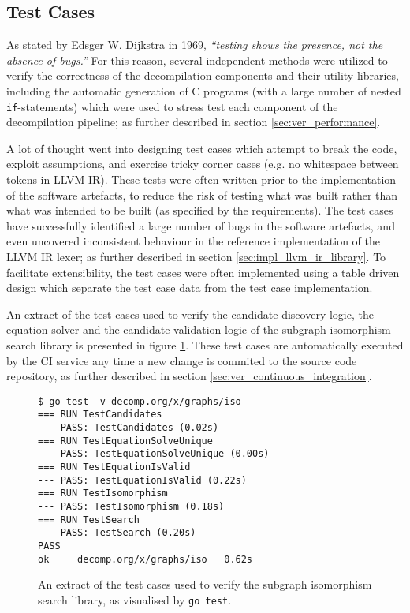 
\subsection{Test Cases}

As stated by Edsger W. Dijkstra in 1969, \textit{``testing shows the presence, not the absence of bugs.''} \cite{absence_of_bugs_quote} For this reason, several independent methods were utilized to verify the correctness of the decompilation components and their utility libraries, including the automatic generation of C programs (with a large number of nested \texttt{if}-statements) which were used to stress test each component of the decompilation pipeline; as further described in section \ref{sec:ver_performance}.

A lot of thought went into designing test cases which attempt to break the code, exploit assumptions, and exercise tricky corner cases (e.g. no whitespace between tokens in LLVM IR). These tests were often written prior to the implementation of the software artefacts, to reduce the risk of testing what was built rather than what was intended to be built (as specified by the requirements). The test cases have successfully identified a large number of bugs in the software artefacts, and even uncovered inconsistent behaviour in the reference implementation of the LLVM IR lexer; as further described in section \ref{sec:impl_llvm_ir_library}. To facilitate extensibility, the test cases were often implemented using a table driven design which separate the test case data from the test case implementation.

An extract of the test cases used to verify the candidate discovery logic, the equation solver and the candidate validation logic of the subgraph isomorphism search library is presented in figure \ref{fig:iso_test_cases}. These test cases are automatically executed by the CI service any time a new change is commited to the source code repository, as further described in section \ref{sec:ver_continuous_integration}.

\begin{figure}[htbp]
	\begin{center}
		\begin{verbatim}
$ go test -v decomp.org/x/graphs/iso
=== RUN TestCandidates
--- PASS: TestCandidates (0.02s)
=== RUN TestEquationSolveUnique
--- PASS: TestEquationSolveUnique (0.00s)
=== RUN TestEquationIsValid
--- PASS: TestEquationIsValid (0.22s)
=== RUN TestIsomorphism
--- PASS: TestIsomorphism (0.18s)
=== RUN TestSearch
--- PASS: TestSearch (0.20s)
PASS
ok     decomp.org/x/graphs/iso   0.62s
		\end{verbatim}
		\caption{An extract of the test cases used to verify the subgraph isomorphism search library, as visualised by \texttt{go test}.}
		\label{fig:iso_test_cases}
	\end{center}
\end{figure}



